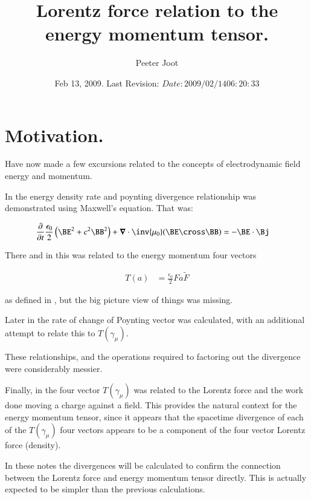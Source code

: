 \documentclass{article}
\title{ Lorentz force relation to the energy momentum tensor. }
\author{Peeter Joot}
\date{ Feb 13, 2009.  Last Revision: $Date: 2009/02/14 06:20:33 $ }
\begin{document}
\maketitle{}

\tableofcontents

\section{ Motivation. }

Have now made a few excursions related to the concepts of electrodynamic
field energy and momentum.

In \cite{PJpoynting} the energy density rate and poynting divergence 
relationship was demonstrated using Maxwell's equation.  That was:

\begin{align}
\PD{t}{}\frac{\epsilon_0}{2} \left(\BE^2 + c^2 \BB^2\right) + \spacegrad \cdot \inv{\mu_0}(\BE \cross \BB) &= -\BE \cdot \Bj 
\end{align}

There and in \cite{PJemstresstensor} this was related to the 
energy momentum four vectors

\begin{align}
T(a) &= \frac{\epsilon_0}{2} F a \tilde{F}
\end{align}

as defined
in \cite{doran2003gap}, but the big picture view 
of things was missing.

Later in \cite{PJpoyntingRate} the rate of change of Poynting vector
was calculated, with an additional attempt to relate this to $T(\gamma_\mu)$.

These relationships, and the operations required to factoring out the divergence were considerably messier.

Finally, in \cite{PJelectricFieldEnergy} the four vector $T(\gamma_\mu)$
was related to the Lorentz force and the work done moving a charge against
a field.  This provides the natural context for the energy momentum tensor, 
since it appears that the spacetime divergence of each of the
$T(\gamma_\mu)$ four vectors appears to be a component of the
four vector Lorentz force (density).  

In these notes the divergences will be calculated to confirm the
connection between the Lorentz force and energy momentum tensor directly.
This is actually expected to be simpler than the previous calculations.
\end{document}
